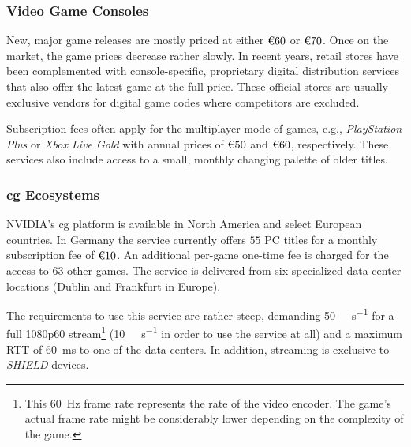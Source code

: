 




\subsubsection{Video Game Consoles}

New, major game releases are mostly priced at either
$\text{\texteuro} 60$ or $\text{\texteuro} 70$. Once on the market, the
game prices decrease rather slowly. In recent years, retail stores have
been complemented with console-specific, proprietary digital
distribution services that also offer the latest game at the full price.
These official stores are usually exclusive vendors for digital game
codes where competitors are excluded.

Subscription fees often apply for the multiplayer mode of games, e.g.,
\textit{PlayStation Plus} or \textit{Xbox Live Gold} with annual prices
of $\text{\texteuro} 50$ and $\text{\texteuro} 60$, respectively. These
services also include access to a small, monthly changing palette of
older titles.




\subsubsection{\Gls{cg} Ecosystems}

NVIDIA's \gls{cg} platform%
\gfnow
is available in North America and select European countries.
In Germany the service currently offers $55$ PC titles
for a monthly subscription fee of $\text{\texteuro} 10$. An additional
per-game one-time fee
is charged for the access to $63$ other games.
The service is delivered from six
specialized data center locations (Dublin and Frankfurt in Europe).

The requirements to use this service are rather steep, demanding
\SI{50}{\mega\bit\per\second} for a full
1080p60 stream\footnote{\label{foot:rate}This
\SI{60}{\hertz} frame rate represents the rate of the video encoder.
The game's actual frame rate might be considerably lower depending on
the complexity of the game.} (\SI{10}{\mega\bit\per\second} in
order to use the service at all) and a maximum \acrshort{RTT} of
\SI{60}{\milli\second} to one of the data centers. In addition,
streaming is exclusive to \textit{SHIELD} devices.

